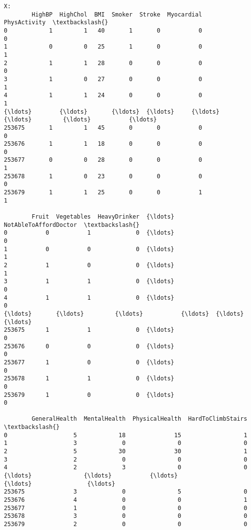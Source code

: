 \documentclass[11pt]{article}
\begin{document}
    \begin{Verbatim}[commandchars=\\\{\}]
X:
        HighBP  HighChol  BMI  Smoker  Stroke  Myocardial  PhysActivity  \textbackslash{}
0            1         1   40       1       0           0             0
1            0         0   25       1       0           0             1
2            1         1   28       0       0           0             0
3            1         0   27       0       0           0             1
4            1         1   24       0       0           0             1
{\ldots}        {\ldots}       {\ldots}  {\ldots}     {\ldots}     {\ldots}         {\ldots}           {\ldots}
253675       1         1   45       0       0           0             0
253676       1         1   18       0       0           0             0
253677       0         0   28       0       0           0             1
253678       1         0   23       0       0           0             0
253679       1         1   25       0       0           1             1

        Fruit  Vegetables  HeavyDrinker  {\ldots}  NotAbleToAffordDoctor  \textbackslash{}
0           0           1             0  {\ldots}                      0
1           0           0             0  {\ldots}                      1
2           1           0             0  {\ldots}                      1
3           1           1             0  {\ldots}                      0
4           1           1             0  {\ldots}                      0
{\ldots}       {\ldots}         {\ldots}           {\ldots}  {\ldots}                    {\ldots}
253675      1           1             0  {\ldots}                      0
253676      0           0             0  {\ldots}                      0
253677      1           0             0  {\ldots}                      0
253678      1           1             0  {\ldots}                      0
253679      1           0             0  {\ldots}                      0

        GeneralHealth  MentalHealth  PhysicalHealth  HardToClimbStairs  \textbackslash{}
0                   5            18              15                  1
1                   3             0               0                  0
2                   5            30              30                  1
3                   2             0               0                  0
4                   2             3               0                  0
{\ldots}               {\ldots}           {\ldots}             {\ldots}                {\ldots}
253675              3             0               5                  0
253676              4             0               0                  1
253677              1             0               0                  0
253678              3             0               0                  0
253679              2             0               0                  0


\end{Verbatim}
\end{document}
